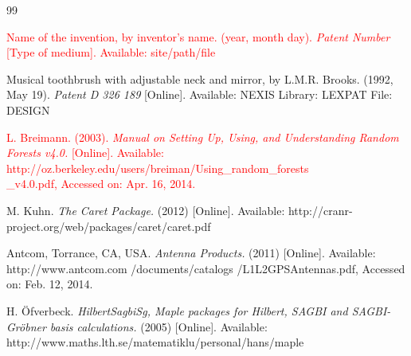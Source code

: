 \documentclass[11pt,a5paper,twoside]{article}
\begin{document}
\begin{thebibliography}{99}


  \textcolor{red}{
Name of the invention, by inventor's name. (year, month day). \textit{Patent Number }[Type of medium]. Available: site/path/file 
}

  Musical toothbrush with adjustable neck and mirror, by L.M.R. Brooks. (1992, May 19). \textit{Patent D 326 189 }[Online]. Available: NEXIS Library: LEXPAT File: DESIGN 


 \textcolor{red}{
 L. Breimann. (2003). \textit{Manual on Setting Up, Using, and Understanding Random Forests v4.0. }[Online]. Available: 
http://oz.berkeley.edu/users/breiman/Using{\_}random{\_}forests\\
{\_}v4.0.pdf, Accessed on: Apr. 16, 2014. 
}

  M. Kuhn. \textit{The Caret Package. }(2012) [Online]. Available: 
http://cranr-project.org/web/packages/caret/caret.pdf 

  Antcom, Torrance, CA, USA. \textit{Antenna Products. }(2011) [Online]. Available: 
http://www.antcom.com /documents/catalogs /L1L2GPSAntennas.pdf, Accessed on: Feb. 12, 2014. 

H. {\"O}fverbeck. \textit{HilbertSagbiSg, Maple packages for Hilbert,
	SAGBI and SAGBI-Gr{\"o}bner basis calculations.} (2005) [Online]. Available: 
http://www.maths.lth.se/matematiklu/personal/hans/maple

\end{thebibliography}
\end{document}
